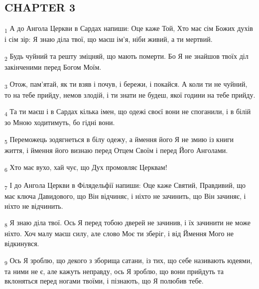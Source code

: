 \subsection{CHAPTER 3}
\begin{tcolorbox}
\textsubscript{1} А до Ангола Церкви в Сардах напиши: Оце каже Той, Хто має сім Божих духів і сім зір: Я знаю діла твої, що маєш ім'я, ніби живий, а ти мертвий.
\end{tcolorbox}
\begin{tcolorbox}
\textsubscript{2} Будь чуйний та решту зміцняй, що мають померти. Бо Я не знайшов твоїх діл закінченими перед Богом Моїм.
\end{tcolorbox}
\begin{tcolorbox}
\textsubscript{3} Отож, пам'ятай, як ти взяв і почув, і бережи, і покайся. А коли ти не чуйний, то на тебе прийду, немов злодій, і ти знати не будеш, якої години на тебе прийду.
\end{tcolorbox}
\begin{tcolorbox}
\textsubscript{4} Та ти маєш і в Сардах кілька імен, що одежі своєї вони не споганили, і в білій зо Мною ходитимуть, бо гідні вони.
\end{tcolorbox}
\begin{tcolorbox}
\textsubscript{5} Переможець зодягнеться в білу одежу, а ймення його Я не змию із книги життя, і ймення його визнаю перед Отцем Своїм і перед Його Анголами.
\end{tcolorbox}
\begin{tcolorbox}
\textsubscript{6} Хто має вухо, хай чує, що Дух промовляє Церквам!
\end{tcolorbox}
\begin{tcolorbox}
\textsubscript{7} І до Ангола Церкви в Філядельфії напиши: Оце каже Святий, Правдивий, що має ключа Давидового, що Він відчиняє, і ніхто не зачинить, що Він зачиняє, і ніхто не відчинить.
\end{tcolorbox}
\begin{tcolorbox}
\textsubscript{8} Я знаю діла твої. Ось Я перед тобою дверей не зачинив, і їх зачинити не може ніхто. Хоч малу маєш силу, але слово Моє ти зберіг, і від Ймення Мого не відкинувся.
\end{tcolorbox}
\begin{tcolorbox}
\textsubscript{9} Ось Я зроблю, що декого з зборища сатани, із тих, що себе називають юдеями, та ними не є, але кажуть неправду, ось Я зроблю, що вони прийдуть та вклоняться перед ногами твоїми, і пізнають, що Я полюбив тебе.
\end{tcolorbox}
